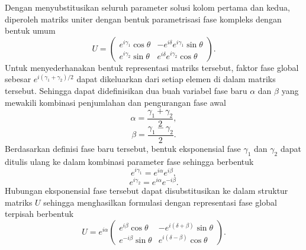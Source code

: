 Dengan menyubstitusikan seluruh parameter solusi kolom pertama dan kedua, diperoleh matriks uniter dengan bentuk parametrisasi fase kompleks dengan bentuk umum
\begin{equation}
U = \begin{pmatrix} e^{i\gamma_1}\cos\theta & -e^{i\delta}e^{i\gamma_1}\sin\theta \\ e^{i\gamma_2}\sin\theta & e^{i\delta}e^{i\gamma_2}\cos\theta \end{pmatrix}.
\end{equation}
Untuk menyederhanakan bentuk representasi matriks tersebut, faktor fase global sebesar $e^{i(\gamma_1+\gamma_2)/2}$ dapat dikeluarkan dari setiap elemen di dalam matriks tersebut. Sehingga dapat didefinisikan dua buah variabel fase baru $\alpha$ dan $\beta$ yang mewakili kombinasi penjumlahan dan pengurangan fase awal
\begin{equation}
\label{eq:app_def_alpha}
\alpha = \frac{\gamma_1 + \gamma_2}{2},
\end{equation}
\begin{equation}
\label{eq:app_def_beta}
\beta = \frac{\gamma_1 - \gamma_2}{2}.
\end{equation}
Berdasarkan definisi fase baru tersebut, bentuk eksponensial fase $\gamma_1$ dan $\gamma_2$ dapat ditulis ulang ke dalam kombinasi parameter fase sehingga berbentuk
\begin{equation}
\label{eq:app_rel_g1}
e^{i\gamma_1} = e^{i\alpha} e^{i\beta},
\end{equation}
\begin{equation}
\label{eq:app_rel_g2}
e^{i\gamma_2} = e^{i\alpha} e^{-i\beta}.
\end{equation}
Hubungan eksponensial fase tersebut dapat disubstitusikan ke dalam struktur matriks $U$ sehingga menghasilkan formulasi dengan representasi fase global terpisah berbentuk
\begin{equation}
U = e^{i\alpha} \begin{pmatrix} e^{i\beta}\cos\theta & -e^{i(\delta+\beta)}\sin\theta \\ e^{-i\beta}\sin\theta & e^{i(\delta-\beta)}\cos\theta \end{pmatrix}.
\label{eq:app_U_subtitusi}
\end{equation}

